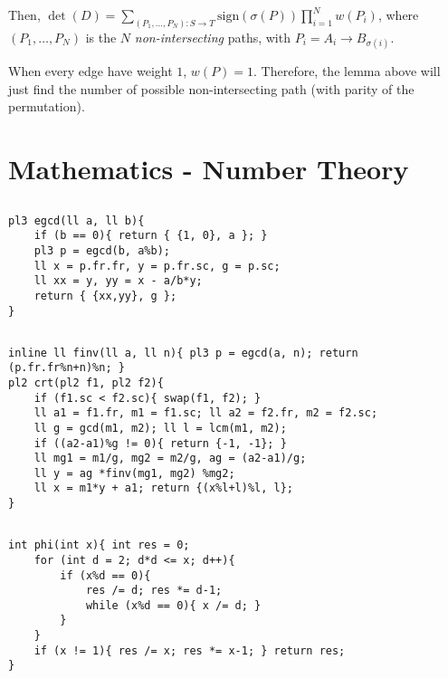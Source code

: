 \documentclass[landscape, 8pt, a4paper, oneside, twocolumn]{extarticle}
\begin{document}
Then, $\det(D) = \sum_{(P_1, \ldots, P_N) \colon S \to T} \mathrm{sign}(\sigma(P)) \prod_{i=1}^{N} w(P_i)$, where $(P_1, \ldots, P_N)$ is the $N$ \textit{non-intersecting} paths, with $P_i = A_i \to B_{\sigma(i)}$.

When every edge have weight $1$, $w(P) = 1$. Therefore, the lemma above will just find the number of possible non-intersecting path (with parity of the permutation).
\section{Mathematics - Number Theory}
\subsection{}
\subsection{}
\begin{verbatim}
pl3 egcd(ll a, ll b){
    if (b == 0){ return { {1, 0}, a }; }
    pl3 p = egcd(b, a%b);
    ll x = p.fr.fr, y = p.fr.sc, g = p.sc;
    ll xx = y, yy = x - a/b*y;
    return { {xx,yy}, g };
}
\end{verbatim}
\subsection{}
\begin{verbatim}
inline ll finv(ll a, ll n){ pl3 p = egcd(a, n); return (p.fr.fr%n+n)%n; }
pl2 crt(pl2 f1, pl2 f2){
    if (f1.sc < f2.sc){ swap(f1, f2); }
    ll a1 = f1.fr, m1 = f1.sc; ll a2 = f2.fr, m2 = f2.sc;
    ll g = gcd(m1, m2); ll l = lcm(m1, m2);
    if ((a2-a1)%g != 0){ return {-1, -1}; }
    ll mg1 = m1/g, mg2 = m2/g, ag = (a2-a1)/g;
    ll y = ag *finv(mg1, mg2) %mg2;
    ll x = m1*y + a1; return {(x%l+l)%l, l};
}
\end{verbatim}
\subsection{}
\begin{verbatim}
int phi(int x){ int res = 0;
    for (int d = 2; d*d <= x; d++){
        if (x%d == 0){
            res /= d; res *= d-1;
            while (x%d == 0){ x /= d; }
        }
    }
    if (x != 1){ res /= x; res *= x-1; } return res;
}
\end{verbatim}
\end{document}
